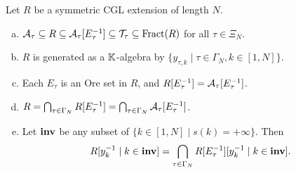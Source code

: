 \begin{theorem}\label{thm:intersections}
	Let $R$ be a symmetric CGL extension of length $N$.
	\begin{enumerate}[(a)]
		\item $\mathcal{A}_\tau \subseteq R \subseteq \mathcal{A}_\tau[E^{-1}_\tau]\subseteq \mathcal{T}_\tau \subseteq \operatorname{Fract}(R)$ for all $\tau \in \Xi_N$.
		\item $R$ is generated as a $\mathbb{K}$-algebra by $\{y_{\tau, k} \mid \tau \in \Gamma_N, k \in [1, N]\}$.
		\item Each $E_\tau$ is an Ore set in $R$, and $R[E^{-1}_\tau] = \mathcal{A}_\tau[E^{-1}_\tau]$.
		\item $R = \bigcap_{\tau \in \Gamma_N} R[E^{-1}_\tau] = \bigcap_{\tau\in\Gamma_N}\mathcal{A}_\tau[E^{-1}_\tau]$.
		\item Let $\mathbf{inv}$ be any subset of $\{k \in [1, N] \mid s(k) = +\infty \}$. Then
		      \begin{equation*}
			      R[y_k^{-1} \mid k \in \mathbf{inv}] = \bigcap_{\tau \in \Gamma_N} R[E^{-1}_\tau][y^{-1}_k \mid k \in \mathbf{inv}].
		      \end{equation*}
	\end{enumerate}
\end{theorem}
